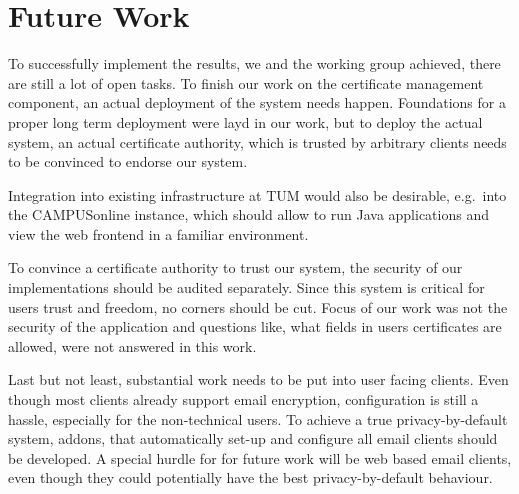 \chapter{Future Work}\label{ch:futureWork}
To successfully implement the results, we and the working group  achieved, there are still a lot of
open tasks.
To finish our work on the certificate management component, an actual deployment of the system needs happen.
Foundations for a proper long term deployment were layd in our work, but to deploy the actual system,
an actual certificate authority, which is trusted by arbitrary clients needs to be convinced to endorse our system.

Integration into existing infrastructure at TUM would also be desirable, e.g.\ into the CAMPUSonline instance, which
should allow to run Java applications and view the web frontend in a familiar environment.

To convince a certificate authority to trust our system, the security of our implementations should be audited
separately.
Since this system is critical for users trust and freedom, no corners should be cut.
Focus of our work was not the security of the application and questions like, what fields in users certificates are
allowed, were not answered in this work.

Last but not least, substantial work needs to be put into user facing clients.
Even though most clients already support email encryption, configuration is still a hassle, especially for the
non-technical users.
To achieve a true privacy-by-default system, addons, that automatically set-up and configure all email clients should be
developed.
A special hurdle for for future work will be web based email clients, even though they could potentially have the best
privacy-by-default behaviour.

\pagestyle{thesischapter}
\cleardoublepage
{}
\printbibliography[heading=bibintoc]
